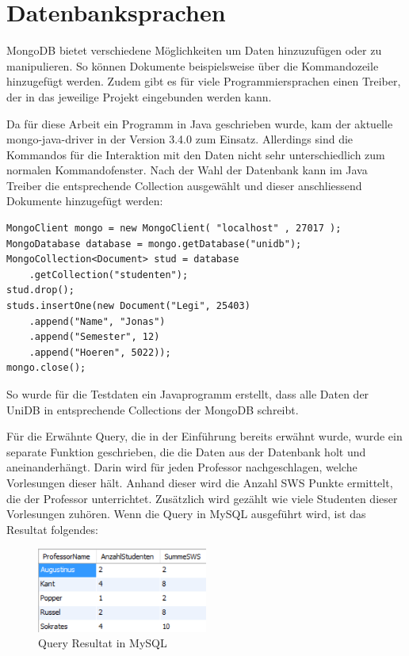 \section{Datenbanksprachen}
 
MongoDB bietet verschiedene Möglichkeiten um Daten hinzuzufügen oder zu manipulieren. So können Dokumente beispielsweise über die Kommandozeile hinzugefügt werden. Zudem gibt es für viele Programmiersprachen einen Treiber, der in das jeweilige Projekt eingebunden werden kann. 
 
Da für diese Arbeit ein Programm in Java geschrieben wurde, kam der aktuelle mongo-java-driver in der Version 3.4.0 zum Einsatz. Allerdings sind die Kommandos für die Interaktion mit den Daten nicht sehr unterschiedlich zum normalen Kommandofenster. Nach der Wahl der Datenbank kann im Java Treiber  die entsprechende Collection ausgewählt und dieser anschliessend Dokumente hinzugefügt werden:
 
\begin{lstlisting}
MongoClient mongo = new MongoClient( "localhost" , 27017 );
MongoDatabase database = mongo.getDatabase("unidb");
MongoCollection<Document> stud = database
	.getCollection("studenten");
stud.drop();
studs.insertOne(new Document("Legi", 25403)
	.append("Name", "Jonas")
	.append("Semester", 12)
	.append("Hoeren", 5022));
mongo.close();
\end{lstlisting}

So wurde für die Testdaten ein Javaprogramm erstellt, dass alle Daten der UniDB in entsprechende Collections der MongoDB schreibt.

Für die Erwähnte Query, die in der Einführung bereits erwähnt wurde, wurde ein separate Funktion geschrieben, die die Daten aus der Datenbank holt und aneinanderhängt. Darin wird für jeden Professor nachgeschlagen, welche Vorlesungen dieser hält. Anhand dieser wird die Anzahl SWS Punkte ermittelt, die der Professor unterrichtet. Zusätzlich wird gezählt wie viele Studenten dieser Vorlesungen zuhören. Wenn die Query in MySQL ausgeführt wird, ist das Resultat folgendes:

\begin{figure}[h] 
	\centering
	\includegraphics[width=0.5\textwidth]{./pictures/Query_MySQL_result.png}
	\caption{Query Resultat in MySQL \cite{Kaufmann2016}}
	\label{fig:mysqlres}
\end{figure}


